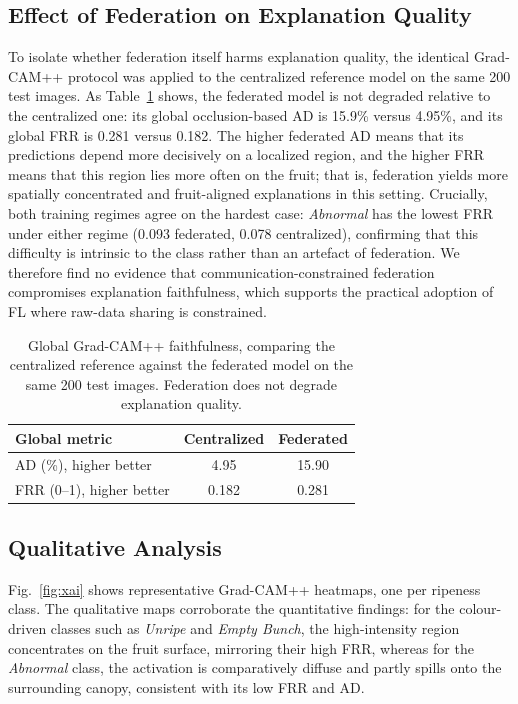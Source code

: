\documentclass[conference, compsoc, twoside]{IEEEtran}
\begin{document}
\subsection{Effect of Federation on Explanation Quality}
To isolate whether federation itself harms explanation quality, the identical Grad-CAM++ protocol was applied to the centralized reference model on the same 200 test images. As Table~\ref{tab:fedvscen} shows, the federated model is not degraded relative to the centralized one: its global occlusion-based AD is 15.9\% versus 4.95\%, and its global FRR is 0.281 versus 0.182. The higher federated AD means that its predictions depend more decisively on a localized region, and the higher FRR means that this region lies more often on the fruit; that is, federation yields more spatially concentrated and fruit-aligned explanations in this setting. Crucially, both training regimes agree on the hardest case: \textit{Abnormal} has the lowest FRR under either regime (0.093 federated, 0.078 centralized), confirming that this difficulty is intrinsic to the class rather than an artefact of federation. We therefore find no evidence that communication-constrained federation compromises explanation faithfulness, which supports the practical adoption of FL where raw-data sharing is constrained.

\begin{table}[!htbp]
\centering
\caption{Global Grad-CAM++ faithfulness, comparing the centralized reference against the federated model on the same 200 test images. Federation does not degrade explanation quality.}
\label{tab:fedvscen}
\small
\begin{tabular}{lcc}
\hline
Global metric                & Centralized & Federated \\
\hline
AD (\%), higher better       & 4.95        & 15.90     \\
FRR (0--1), higher better    & 0.182       & 0.281     \\
\hline
\end{tabular}
\end{table}

\subsection{Qualitative Analysis}
Fig.~\ref{fig:xai} shows representative Grad-CAM++ heatmaps, one per ripeness class. The qualitative maps corroborate the quantitative findings: for the colour-driven classes such as \textit{Unripe} and \textit{Empty Bunch}, the high-intensity region concentrates on the fruit surface, mirroring their high FRR, whereas for the \textit{Abnormal} class, the activation is comparatively diffuse and partly spills onto the surrounding canopy, consistent with its low FRR and AD.
\end{document}
